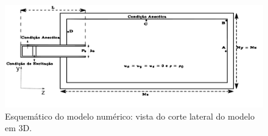 
\begin{figure}[ht!]
\centering
  \includegraphics[width=1.\linewidth]{figuras/modelo_numerico_3.pdf}
  \caption[Esquemático do modelo numérico]{Esquemático do modelo numérico: vista do corte lateral do modelo em 3D.}
  \label{fig:modelo}
\end{figure}


